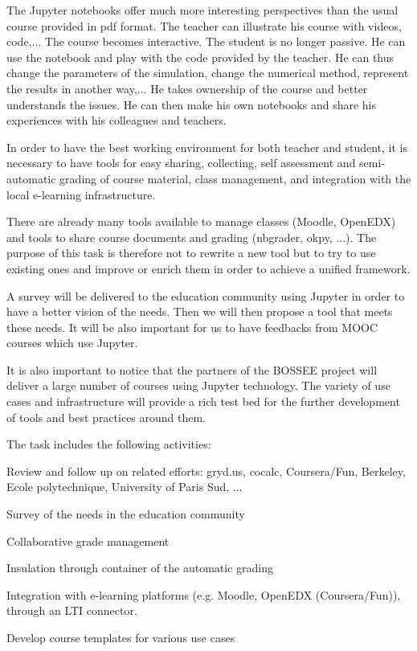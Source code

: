 \begin{task}[
  title=Teaching tools,
  id=teaching-tools,
  lead=EP,
  PM=20, %
  wphases={0-48},
  partners={EP,UPSUD}]

  The Jupyter notebooks offer much more interesting perspectives than the usual
  course provided in pdf format. The teacher can illustrate his course with
  videos, code,... The course becomes interactive. The student is no longer
  passive. He can use the notebook and play with the code provided by
  the teacher. He can thus change the parameters of the simulation, change the
  numerical method, represent the results in another way,... He takes ownership
  of the course and better understands the issues. He can then make his own
  notebooks and share his experiences with his colleagues and teachers.

  In order to have the best working environment for both teacher and student, it
  is necessary to have tools for easy sharing,
  collecting, self assessment and semi-automatic grading of course material,
  class management, and integration with the local e-learning infrastructure.
  
  There are already many tools available to manage classes (Moodle, OpenEDX) and tools to
  share course documents and grading (nbgrader, okpy, ...). The purpose of this
  task is therefore not to rewrite a new tool but to try to use existing ones
  and improve or enrich them in order to achieve a unified framework.

  A survey will be delivered to the education community using Jupyter in order to have
  a better vision of the needs. Then we will then propose a tool that meets
  these needs. It will be also important for us to have feedbacks from MOOC courses which use Jupyter.

  It is also important to notice that the partners of the BOSSEE project will
  deliver a large number of courses using Jupyter technology. The variety of use
  cases and infrastructure will provide a rich test bed for the further
  development of tools and best practices around them.

  The task includes the following activities:
  \begin{compactitem}
  \item Review and follow up on related efforts: gryd.us, cocalc, Coursera/Fun,
    Berkeley, Ecole polytechnique, University of Paris Sud, ...
  \item Survey of the needs in the education community
  \item Collaborative grade management
  \item Insulation through container of the automatic grading
  \item Integration with e-learning platforms (e.g. Moodle, OpenEDX
    (Coursera/Fun)), through an LTI connector.
  \item Develop course templates for various use cases
  \end{compactitem}
\end{task}
